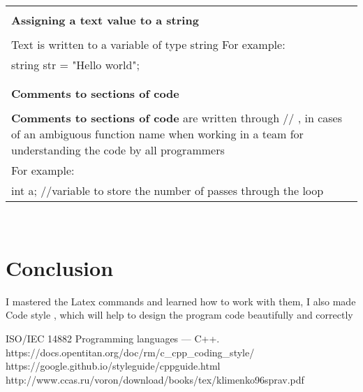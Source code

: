 \documentclass{article}
\begin{document}
\begin{tabular}{|p{}|}
\hline \\ 
\textbf{\Large {Assigning a text value to a string}}\\ \\
Text is written to a variable of type string
For example:\\
string str = "Hello world";\\ \\
\hline\\
\textbf{\Large {Comments to sections of code}}\\ \\
\textbf{Comments to sections of code} are written through // , in cases of an ambiguous function name when working in a team for understanding the code by all programmers\\
For example:\\
int a; //variable to store the number of passes through the loop\\
\hline
\end{tabular}\\
\newpage
\section{Conclusion}
\LARGE{I mastered the Latex commands and learned how to work with them, I also made Code style , which will help to design the program code beautifully and correctly}\\
\hline
\begin{thebibliography}{4}
ISO/IEC 14882 Programming languages — C++.
https://docs.opentitan.org/doc/rm/c\_cpp\_coding\_style/
https://google.github.io/styleguide/cppguide.html
http://www.ccas.ru/voron/download/books/tex/klimenko96sprav.pdf

\end{thebibliography}
\end{document}
